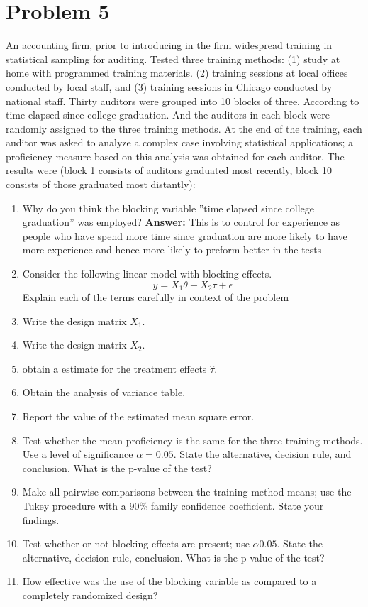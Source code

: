\documentclass{article}
\begin{document}
\section{Problem 5}
An accounting firm, prior to introducing in the firm widespread training in statistical sampling for
auditing. Tested three training methods: (1) study at home with programmed training materials.
(2) training sessions at local offices conducted by local staff, and (3) training sessions in Chicago
conducted by national staff. Thirty auditors were grouped into 10 blocks of three. According to
time elapsed since college graduation. And the auditors in each block were randomly assigned to the
three training methods. At the end of the training, each auditor was asked to analyze a complex
case involving statistical applications; a proficiency measure based on this analysis was obtained
for each auditor. The results were (block 1 consists of auditors graduated most recently, block 10
consists of those graduated most distantly):
\begin{enumerate}
	\item Why do you think the blocking variable ”time elapsed since college graduation” was employed?
	      \textbf{Answer:} This is to control for experience as people who have spend more time since graduation
	      are more likely to have more experience and hence more likely to preform better in the tests
	\item Consider the following linear model with blocking effects.
	      $$
		      y= X_1 \theta + X_2 \tau + \epsilon
	      $$
	      Explain each of the terms carefully in context of the problem
	\item Write the design matrix $X_1$.
	\item Write the design matrix $X_2$.
	\item obtain a estimate for the treatment effects $\hat{\tau}$.
	\item Obtain the analysis of variance table.
	\item Report the value of the estimated mean square error.
	\item Test whether the mean proficiency is the same for the three training methods. Use a level of significance
	      $\alpha = 0.05$. State the alternative, decision rule, and conclusion. What is the p-value of the test?
	\item Make all pairwise comparisons between the training method means; use the Tukey procedure with a 90\% family
	      confidence coefficient. State your findings.
	\item Test whether or not blocking effects are present; use $\alpha 0.05$. State the alternative, decision rule,
	      conclusion. What is the p-value of the test?
	\item How effective was the use of the blocking variable as compared to a completely randomized design?
\end{enumerate}
\end{document}
